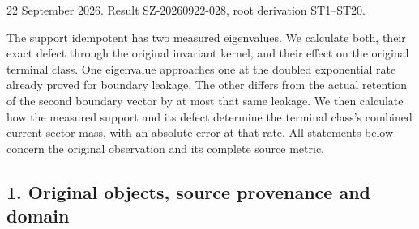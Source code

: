 \documentclass[10pt]{article}
\begin{document}
22 September 2026. Result SZ-20260922-028, root derivation ST1--ST20.

The support idempotent has two measured eigenvalues. We calculate both, their exact defect through the original invariant kernel, and their effect on the original terminal class. One eigenvalue approaches one at the doubled exponential rate already proved for boundary leakage. The other differs from the actual retention of the second boundary vector by at most that same leakage. We then calculate how the measured support and its defect determine the terminal class's combined current-sector mass, with an absolute error at that rate. All statements below concern the original observation and its complete source metric.

\subsection{1. Original objects, source provenance and domain}\label{original-objects-source-provenance-and-domain}
\end{document}
